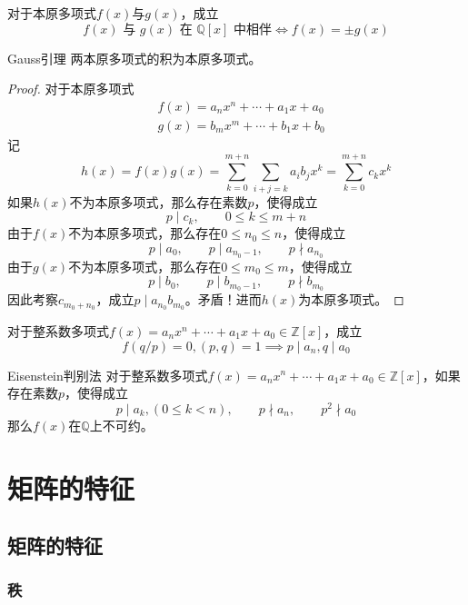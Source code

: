 \documentclass[lang = cn, scheme = chinese, thmcnt = section]{elegantbook}
\newcommand{\Q}{\mathbb{Q}}            %
\newcommand{\Z}{\mathbb{Z}}            %
\begin{document}
\begin{theorem}
	对于本原多项式$f(x)$与$g(x)$，成立
	$$
	f(x)\text{ 与 }g(x)\text{ 在 }\Q[x]\text{ 中相伴}
	\iff 
	f(x)=\pm g(x)
	$$
\end{theorem}

\begin{theorem}{Gauss引理}
	两本原多项式的积为本原多项式。
\end{theorem}

\begin{proof}
	对于本原多项式
	\begin{align*}
		& f(x)=a_nx^n+\cdots+a_1x+a_0\\
		& g(x)=b_mx^m+\cdots+b_1x+b_0
	\end{align*}
	记
	$$
	h(x)=f(x)g(x)
	=\sum_{k=0}^{m+n}\sum_{i+j=k}a_ib_j x^k
	=\sum_{k=0}^{m+n}c_{k} x^k
	$$
	如果$h(x)$不为本原多项式，那么存在素数$p$，使得成立
	$$
	p\mid c_k,\qquad 0\le k \le m+n
	$$
	由于$f(x)$不为本原多项式，那么存在$0\le n_0 \le n$，使得成立
	$$
	p\mid a_0,\qquad 
	p\mid a_{n_0-1},\qquad 
	p\nmid a_{n_0}
	$$
	由于$g(x)$不为本原多项式，那么存在$0\le m_0 \le m$，使得成立
	$$
	p\mid b_0,\qquad 
	p\mid b_{m_0-1},\qquad 
	p\nmid b_{m_0}
	$$
	因此考察$c_{m_0+n_0}$，成立$p\mid a_{n_0}b_{m_0}$。矛盾！进而$h(x)$为本原多项式。
\end{proof}

\begin{theorem}
	对于整系数多项式$f(x)=a_nx^n+\cdots+a_1x+a_0\in\Z[x]$，成立
	$$
	f(q/p)=0,(p,q)=1\implies
	p\mid a_n,q\mid a_0
	$$
\end{theorem}

\begin{theorem}{Eisenstein判别法}
	对于整系数多项式$f(x)=a_nx^n+\cdots+a_1x+a_0\in\Z[x]$，如果存在素数$p$，使得成立
	$$
	p\mid a_k,(0\le k <n),\qquad 
	p\nmid a_n,\qquad 
	p^2\nmid a_0
	$$
	那么$f(x)$在$\Q$上不可约。
\end{theorem}

\chapter{矩阵的特征}

\section{矩阵的特征}

\subsection{秩}
\end{document}
